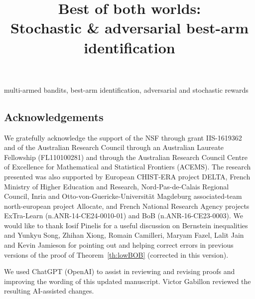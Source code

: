 \documentclass[final,12pt]{colt2018} %
\title[Best of both worlds: Stochastic \& adversarial
 best-arm identification]{\textcolor{pearOne}{Best of both worlds:} \\ \textcolor{pearDark}{Stochastic} 
 	\textcolor{pearOne}{\&} \textcolor{pearThree}{adversarial} 
 	 best-arm identification}
\begin{document}
\maketitle



\begin{keywords}
multi-armed bandits, best-arm identification, adversarial and stochastic rewards
\end{keywords}





\hypersetup{
	colorlinks,
	citecolor=pearDark,
	linkcolor=pearThree,
	urlcolor=pearDarker}









%


\subsection*{Acknowledgements}
We gratefully acknowledge the support of the NSF through grant IIS-1619362 and of the Australian Research Council through an Australian Laureate Fellowship (FL110100281) and through the Australian Research Council Centre of Excellence for Mathematical and Statistical Frontiers (ACEMS).
The research presented was also supported by European CHIST-ERA project DELTA, French Ministry of
Higher Education and Research, Nord-Pas-de-Calais Regional Council,
Inria and Otto-von-Guericke-Universit\"at Magdeburg associated-team north-european project Allocate, and French National Research Agency projects ExTra-Learn (n.ANR-14-CE24-0010-01) and BoB (n.ANR-16-CE23-0003).
We would like to thank Iosif Pinelis for a useful discussion on Bernstein inequalities and Yunkyu Song, Zhihan Xiong, Romain Camilleri, Maryam Fazel, Lalit Jain and Kevin Jamieson for pointing out  and helping correct errors in  previous versions of the proof of Theorem~\ref{th:lowBOB} (corrected in this version).

We used ChatGPT (OpenAI) to assist in reviewing
and revising proofs and improving the wording
of this updated manuscript. Victor Gabillon reviewed
the resulting AI-assisted changes.





\newpage
\appendix
	
\end{document}
